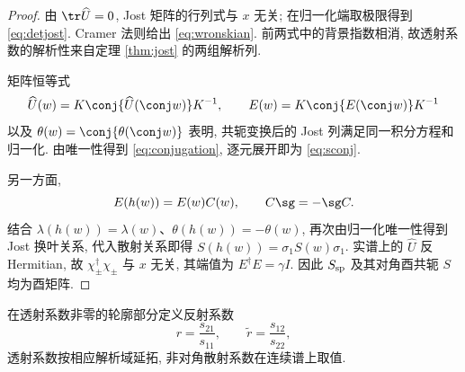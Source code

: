 \begin{proof}
由 $\tr\widehat U=0$, Jost 矩阵的行列式与 $x$ 无关; 在归一化端取极限得到 \eqref{eq:detjost}. Cramer 法则给出 \eqref{eq:wronskian}. 前两式中的背景指数相消, 故透射系数的解析性来自定理 \ref{thm:jost} 的两组解析列.

矩阵恒等式
\[
\widehat U(w)=K\conj{\widehat U(\conj w)}K^{-1},\qquad
E(w)=K\conj{E(\conj w)}K^{-1}
\]
以及 $\theta(w)=\conj{\theta(\conj w)}$ 表明, 共轭变换后的 Jost 列满足同一积分方程和归一化. 由唯一性得到 \eqref{eq:conjugation}, 逐元展开即为 \eqref{eq:sconj}.

另一方面,
\begin{equation}\label{eq:Esheet}
E(h(w))=E(w)C(w),\qquad C\sg=-\sg C.
\end{equation}
结合 $\lambda(h(w))=\lambda(w)$、$\theta(h(w))=-\theta(w)$, 再次由归一化唯一性得到 Jost 换叶关系, 代入散射关系即得 $S(h(w))=\sigma_1S(w)\sigma_1$. 实谱上的 $\widehat U$ 反 Hermitian, 故 $\chi_\pm^\dagger\chi_\pm$ 与 $x$ 无关, 其端值为 $E^\dagger E=\gamma I$. 因此 $S_{\rm sp}$ 及其对角酉共轭 $S$ 均为酉矩阵.
\end{proof}

在透射系数非零的轮廓部分定义反射系数
\begin{equation}\label{eq:reflection}
r=\dfrac{s_{21}}{s_{11}},\qquad
\widetilde r=\dfrac{s_{12}}{s_{22}},
\end{equation}
透射系数按相应解析域延拓, 非对角散射系数在连续谱上取值.

